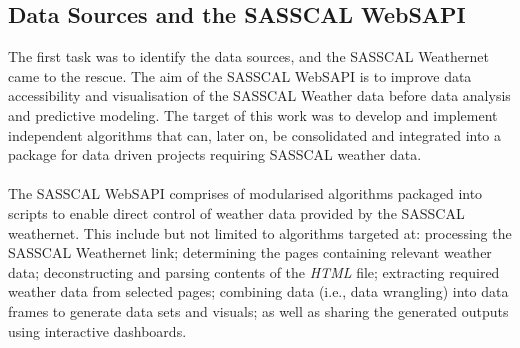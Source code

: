 \documentclass[a4paper, 10pt, conference]{ieeeconf}      %
\begin{document}
	\subsection{\textbf{Data Sources and the SASSCAL WebSAPI}}
\noindent
The first task was to identify the data sources, and the SASSCAL Weathernet came to the rescue.
	The aim of the SASSCAL WebSAPI is to improve data accessibility and visualisation of the SASSCAL Weather data before data analysis and predictive modeling. The  target of this work was to develop and implement independent algorithms that can, later on, be consolidated and integrated into a package for data driven projects requiring   SASSCAL weather data.
\\
\\
	The SASSCAL WebSAPI comprises of modularised algorithms packaged into scripts to enable direct control of  weather data provided by the SASSCAL weathernet. This include but not limited to algorithms targeted at: processing the SASSCAL Weathernet link;  determining the pages containing  relevant weather data;   deconstructing and parsing   contents of the \emph{HTML} file; extracting  required weather data from   selected pages;  combining    data (i.e., data wrangling) into   data frames to generate  data sets and visuals; as well as sharing the generated outputs   using interactive dashboards.
\end{document}
